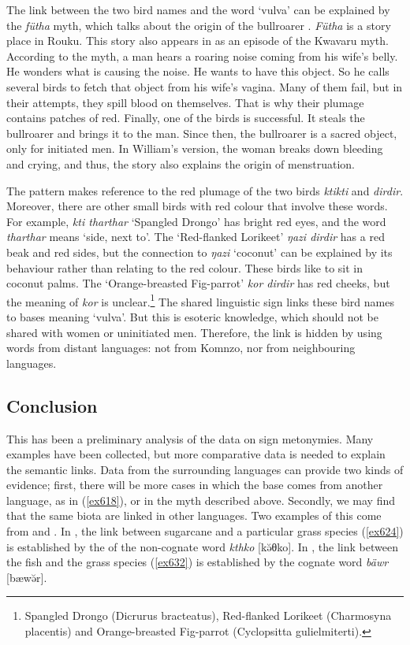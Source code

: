 The link between the two bird names and the word `vulva' can be explained by the \emph{fütha} myth, which talks about the origin of the bullroarer \citep[80]{Ayres:ws}. \emph{Fütha} is a story place in Rouku. This story also appears in \citep[307]{Williams:1936transfly} as an episode of the Kwavaru myth. According to the myth, a man hears a roaring noise coming from his wife's belly. He wonders what is causing the noise. He wants to have this object. So he calls several birds  to fetch that object from his wife's vagina. Many of them fail, but in their attempts, they spill blood on themselves. That is why their plumage contains patches of red. Finally, one of the birds is successful. It steals the bullroarer and brings it to the man. Since then, the bullroarer is a sacred object, only for initiated men. In William's version, the woman breaks down bleeding and crying, and thus, the story also explains the origin of menstruation.

The  pattern makes reference to the red plumage of the two birds \emph{ktikti} and \emph{dirdir}. Moreover, there are other small birds with red colour that involve these words. For example, \emph{kti tharthar} `Spangled Drongo' has bright red eyes, and the word \emph{tharthar} means `side, next to'. The `Red-flanked Lorikeet' \emph{ŋazi dirdir} has a red beak and red sides, but the connection to \emph{ŋazi} `coconut' can be explained by its behaviour rather than relating to the red colour. These birds like to sit in coconut palms. The `Orange-breasted Fig-parrot' \emph{kor dirdir} has red cheeks, but the meaning of \emph{kor} is unclear.\footnote{Spangled Drongo (Dicrurus bracteatus), Red-flanked Lorikeet (Charmosyna placentis) and Orange-breasted Fig-parrot (Cyclopsitta gulielmiterti).} The shared linguistic sign links these bird names to bases meaning `vulva'. But this is esoteric knowledge, which should not be shared with women or uninitiated men. Therefore, the link is hidden by using words from distant languages: not from Komnzo, nor from neighbouring languages.

\subsection{Conclusion}\label{redupconcl}

This has been a preliminary analysis of the data on sign metonymies. Many examples have been collected, but more comparative data is needed to explain the semantic links. Data from the surrounding languages can provide two kinds of evidence; first, there will be more cases in which the base comes from another language, as in (\ref{ex618}), or in the myth described above. Secondly, we may find that the same biota are linked in other languages. Two examples of this come from  and . In , the link between sugarcane and a particular grass species (\ref{ex624}) is established by the  of the non-cognate word \emph{kthko} [kə̆θko]. In , the  link between the fish and the grass species (\ref{ex632}) is established by the cognate word \emph{bäwr} [bæwə̆r].

